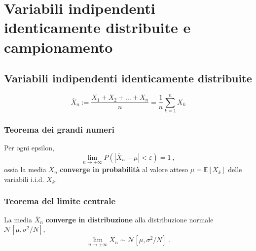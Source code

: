 \chapter{Variabili indipendenti identicamente distribuite e campionamento}
\section{Variabili indipendenti identicamente distribuite}
\begin{definition}
\end{definition}
\begin{equation}
    \overline{X}_n := \dfrac{X_1 + X_2 + \dots + X_n}{n} = \dfrac{1}{n} \sum_{k=1}^{n} X_k
\end{equation}
\subsection{Teorema dei grandi numeri}
\begin{theorem} Per ogni epsilon,
    \begin{equation}
        \lim_{n \rightarrow +\infty} P(|\overline{X}_n - \mu| < \varepsilon) = 1 \ ,
    \end{equation}
    ossia la media $\overline{X}_n$ \textbf{converge in probabilità} al valore atteso $\mu = \mathbb{E}[X_k]$ delle variabili i.i.d. $X_k$.
\end{theorem}

\subsection{Teorema del limite centrale}
\begin{theorem}  La media $\overline{X}_n$ \textbf{converge in distribuzione} alla distribuzione normale $\mathcal{N}[\mu, \sigma^2/N]$,
\begin{equation}
    \lim_{n \rightarrow +\infty} \overline{X}_n \sim \mathcal{N}[\mu, \sigma^2/N] \ .
\end{equation}
\end{theorem}

\begin{example}
\end{example}

